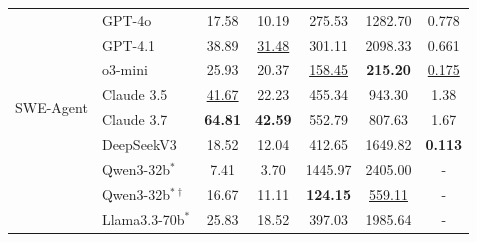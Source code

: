 \documentclass[letterpaper]{article} %
\begin{document}
\begin{table}[!t]
\begin{tabular}{llccccc}
\midrule
\multirow{8}{*}{SWE-Agent}
& \cellcolor{gray!8}GPT-4o       & \cellcolor{gray!8}17.58        & 
\cellcolor{gray!8}10.19        & \cellcolor{gray!8}275.53       & \cellcolor{gray!8}1282.70            & \cellcolor{gray!8}0.778            
\\
& \cellcolor{gray!20}GPT-4.1      
& \cellcolor{gray!20}38.89        
& \cellcolor{gray!20}\underline{31.48}        
& \cellcolor{gray!20}301.11       
& \cellcolor{gray!20}2098.33            
& \cellcolor{gray!20}0.661            
\\
& \cellcolor{gray!16}o3-mini      & \cellcolor{gray!16}25.93 & \cellcolor{gray!16}20.37 &
\cellcolor{gray!16}\underline{158.45} &
\cellcolor{gray!16}\textbf{215.20} & 
\cellcolor{gray!16}\underline{0.175} 
\\
& \cellcolor{gray!16}Claude 3.5    & \cellcolor{gray!16}\underline{41.67} & \cellcolor{gray!16}22.23       & \cellcolor{gray!16}455.34       & \cellcolor{gray!16}943.30             & \cellcolor{gray!16}1.38          
\\
& \cellcolor{gray!32}Claude 3.7    & \cellcolor{gray!32}\textbf{64.81} & \cellcolor{gray!32}\textbf{42.59}       & \cellcolor{gray!32}552.79       & \cellcolor{gray!32}807.63             & \cellcolor{gray!32}1.67            
\\
& \cellcolor{gray!12}DeepSeekV3   & 
\cellcolor{gray!12}18.52        & 
\cellcolor{gray!12}12.04        & 
\cellcolor{gray!12}412.65       & 
\cellcolor{gray!12}1649.82            & \cellcolor{gray!12}\textbf{0.113}          
\\
& \cellcolor{gray!4}Qwen3-32b$^{*}$        & 
\cellcolor{gray!4}7.41            & 
\cellcolor{gray!4}3.70            & 
\cellcolor{gray!4}1445.97            & 
\cellcolor{gray!4}2405.00                  & 
\cellcolor{gray!4}-             
\\
& \cellcolor{gray!12}Qwen3-32b$^{*\dagger}$    
& \cellcolor{gray!12}16.67        
& \cellcolor{gray!12}11.11        
& \cellcolor{gray!12}\textbf{124.15}  
& \cellcolor{gray!12}\underline{559.11}          
& \cellcolor{gray!12}-                
\\
& \cellcolor{gray!12}Llama3.3-70b$^{*}$        & 
\cellcolor{gray!12}25.83            & 
\cellcolor{gray!12}18.52            & 
\cellcolor{gray!12}397.03            & 
\cellcolor{gray!12}1985.64                  & 
\cellcolor{gray!12}-              
\\


\end{tabular}
\end{table}
\end{document}
